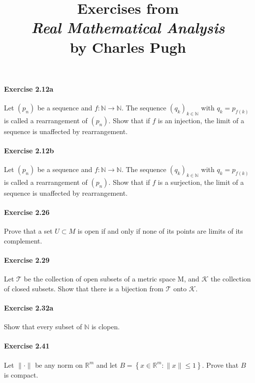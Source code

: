 \documentclass{article}
\title{\textbf{
Exercises from \\
\textit{Real Mathematical Analysis} \\
by Charles Pugh
}}
\date{}
\begin{document}
\maketitle



\paragraph{Exercise 2.12a} Let $(p_n)$ be a sequence and $f:\mathbb{N}\to\mathbb{N}$. The sequence $(q_k)_{k\in\mathbb{N}}$ with $q_k=p_{f(k)}$ is called a rearrangement of $(p_n)$. Show that if $f$ is an injection, the limit of a sequence is unaffected by rearrangement.


\paragraph{Exercise 2.12b} Let $(p_n)$ be a sequence and $f:\mathbb{N}\to\mathbb{N}$. The sequence $(q_k)_{k\in\mathbb{N}}$ with $q_k=p_{f(k)}$ is called a rearrangement of $(p_n)$. Show that if $f$ is a surjection, the limit of a sequence is unaffected by rearrangement.


\paragraph{Exercise 2.26} Prove that a set $U \subset M$ is open if and only if none of its points are limits of its complement.


\paragraph{Exercise 2.29} Let $\mathcal{T}$ be the collection of open subsets of a metric space $\mathrm{M}$, and $\mathcal{K}$ the collection of closed subsets. Show that there is a bijection from $\mathcal{T}$ onto $\mathcal{K}$.


\paragraph{Exercise 2.32a} Show that every subset of $\mathbb{N}$ is clopen.


\paragraph{Exercise 2.41} Let $\|\cdot\|$ be any norm on $\mathbb{R}^{m}$ and let $B=\left\{x \in \mathbb{R}^{m}:\|x\| \leq 1\right\}$. Prove that $B$ is compact.
\end{document}
